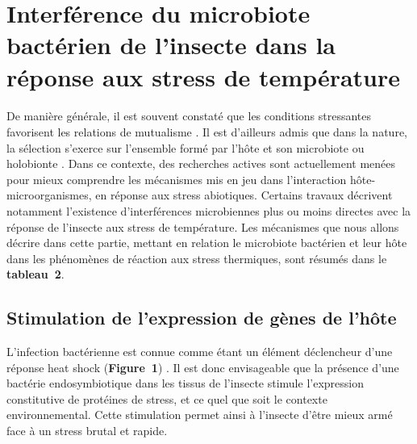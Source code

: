 \section[Interférences du microbiote de l'insecte dans la réponse aux stress de température]%
{Interférence du microbiote bactérien de l'insecte dans la réponse aux stress de température} 

\paragraph*{}
De manière générale, il est souvent constaté que les conditions stressantes favorisent les relations de mutualisme \cite{meadows2013}.
Il est d'ailleurs admis que dans la nature, la sélection s'exerce sur l'ensemble formé par l'hôte et son microbiote ou holobionte \cite{rosenberg2008}.
Dans ce contexte, des recherches actives sont actuellement menées pour mieux comprendre les mécanismes mis en jeu dans l'interaction hôte-microorganismes, en réponse aux stress abiotiques.
Certains travaux décrivent notamment l'existence d'interférences microbiennes plus ou moins directes avec la réponse de l'insecte aux stress de température.
Les mécanismes que nous allons décrire dans cette partie, mettant en relation le microbiote bactérien et leur hôte dans les phénomènes de réaction aux stress thermiques, sont résumés dans le \textbf{tableau~2}.

\subsection{Stimulation de l'expression de gènes de l'hôte}

L'infection bactérienne est connue comme étant un élément déclencheur d'une réponse heat shock (\textbf{Figure~1}) \cite{sorensen2003}.
Il est donc envisageable que la présence d'une bactérie endosymbiotique dans les tissus de l'insecte stimule l'expression constitutive de protéines de stress, et ce quel que soit le contexte environnemental.
Cette stimulation permet ainsi à l'insecte d'être mieux armé face à un stress brutal et rapide.

